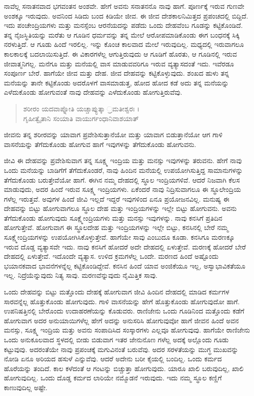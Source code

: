 ನಾವೆಲ್ಲ ಸನಾತನವಾದ ಭಗವಂತನ ಅಂಶವೇ. ಹೇಗೆ ಅವನು ಸನಾತನನೊ ನಾವು ಹಾಗೆ. ಪೂರ್ಣಕ್ಕೆ ಇರುವ ಗುಣವೇ ಅಂಶಕ್ಕೂ ಇರುವುದು. ಅವನಿಂದ ಸಿಡಿದು ಬಂದ ಕಿಡಿಯೇ ಜೀವ. ಈ ಜೀವ ದೇಶಕಾಲನಿಮಿತ್ತದ ಪ್ರಪಂಚದಲ್ಲಿ ಬಿದ್ದಿದೆ. ಇದು ಪಂಚೇಂದ್ರಿಯಗಳು ಮತ್ತು ಮನಸ್ಸೆಂಬ ಆರನೆಯದನ್ನು ಪಡೆದು ಒಂದು ದೇಹವೆಂಬ ಗೂಡನ್ನು ಕಟ್ಟಿಕೊಂಡಿದೆ. ತನ್ನ ನೈಜಸ್ಥಿತಿಯನ್ನು ಮರೆತು ಆ ಗೂಡಿನ ಧರ್ಮವನ್ನು ತನ್ನ ಮೇಲೆ ಆರೋಪಮಾಡಿಕೊಂಡು ಈಗ ಬಂಧನಕ್ಕೆ ಸಿಕ್ಕಿ ನರಳುತ್ತಿದೆ. ಆ ಗೂಡು ಹಿಂದೆ ಇರಲಿಲ್ಲ. ಇನ್ನು ಕೊಂಚ ಕಾಲವಾದ ಮೇಲೆ ಇರುವುದಿಲ್ಲ. ಮಧ್ಯದಲ್ಲಿ ಇರುವಾಗಲೂ ಕಾಲಕಾಲಕ್ಕೆ ಬದಲಾಯಿಸುತ್ತಿದೆ. ಈ ವಿಕಾರಗಳೆಲ್ಲ ಆಗುತ್ತಿರುವುದು ಆ ಗೂಡಿಗೆ ಹೊರತು, ಆ ಗೂಡಿನಲ್ಲಿ ಇರುವ ಜೀವಾತ್ಮನಿಗಲ್ಲ. ಮನೆಗೂ ಮತ್ತು ಮನೆಯಲ್ಲಿ ವಾಸ ಮಾಡುವವರಿಗೂ ಇರುವ ವ್ಯತ್ಯಾಸದಂತೆ ಇದು. ಇವೆರಡೂ ಸಂಪೂರ್ಣ ಬೇರೆ. ಹಾಗೆಯೇ ಜೀವ ಮತ್ತು ದೇಹ. ಜೀವ ದೇಹವನ್ನು ಕಟ್ಟಿಕೊಳ್ಳುವುದು. ಶಂಖದ ಹುಳು ತನ್ನ ಮನೆಯನ್ನು ತಾನೇ ಕಟ್ಟಿಕೊಂಡು ಅದರೊಳಗೆ ವಾಸಮಾಡುತ್ತ, ಹೋದ ಹೋದ ಕಡೆ ಅದು ತನ್ನ ಮನೆಯನ್ನು ಎಳೆದುಕೊಂಡು ಹೋಗುವಂತೆ ನಾವು ದೇಹವನ್ನು ಎಳೆದುಕೊಂಡು ಹೋಗುತ್ತಿರುವೆವು.

\begin{verse}
ಶರೀರಂ ಯದವಾಪ್ನೋತಿ ಯಚ್ಚಾಪ್ಯುತ್ಕಾ ್ರಮತೀಶ್ವರಃ ।\\ಗೃಹೀತ್ವೈತಾನಿ ಸಂಯಾತಿ ವಾಯುರ್ಗಂಧಾನಿವಾಶಯಾತ್ 
\end{verse}

{\small ಜೀವನು ತನ್ನ ಶರೀರವನ್ನು ಯಾವಾಗ ಪ್ರವೇಶಿಸುತ್ತಾನೆಯೋ ಮತ್ತು ಯಾವಾಗ ಬಿಡುತ್ತಾನೆಯೋ ಆಗ ಗಾಳಿ ವಾಸನೆಯನ್ನು ತೆಗೆದುಕೊಂಡು ಹೋಗುವ ಹಾಗೆ ಇವುಗಳನ್ನು ತೆಗೆದುಕೊಂಡು ಹೋಗುವನು.}

ಜೀವಿ ಈ ದೇಹವನ್ನು ಪ್ರವೇಶಿಸುವಾಗ ತನ್ನ ಸೂಕ್ಷ್ಮ ಇಂದ್ರಿಯ ಮತ್ತು ಮನಸ್ಸು ಇವುಗಳನ್ನು ತರುವನು. ಹೇಗೆ ನಾವು ಒಂದು ಮನೆಯನ್ನು ಬಾಡಿಗೆಗೆ ತೆಗೆದುಕೊಂಡರೆ, ನಾವು ಹಿಂದಿನ ಮನೆಯಲ್ಲಿ ಉಪಯೋಗಿಸುತ್ತಿದ್ದ ಸಾಮಾನುಗಳನ್ನು ತೆಗೆದುಕೊಂಡು ಬರುತ್ತೇವೆಯೋ ಹಾಗೆ. ಈಗಿನ ನಮ್ಮ ದೇಹದಲ್ಲಿ ಸ್ಥೂಲ ಇಂದ್ರಿಯಗಳಿವೆ. ಆದರೆ ನಿಜವಾಗಿ ಕೆಲಸ ಮಾಡುವುದು, ಅದರ ಹಿಂದೆ ಇರುವ ಸೂಕ್ಷ್ಮ ಇಂದ್ರಿಯಗಳು. ಏಕೆಂದರೆ ನಾವು ನಿದ್ರಿಸುವಾಗಲೂ ಈ ಸ್ಥೂಲೇಂದ್ರಿಯ ಗಳೆಲ್ಲ ಇರುತ್ತವೆ. ಅವುಗಳ ಹಿಂದೆ ಜೀವಿ ಇಲ್ಲದೆ ಇದ್ದರೆ ಇವುಗಳಿಂದ ಏನೂ ಪ್ರಯೋಜನವಿಲ್ಲ. ಮನುಷ್ಯ ಈ ದೇಹವನ್ನು ಬಿಟ್ಟು ಹೋಗುವಾಗಲೂ ಸ್ಥೂಲ ದೇಹ ಮತ್ತು ಇಂದ್ರಿಯಗಳನ್ನು ಇಲ್ಲೇ ಬಿಟ್ಟು ಹೋಗುವನು. ಅವನು ತೆಗೆದುಕೊಂಡು ಹೋಗುವುದು ಸೂಕ್ಷ್ಮೇಂದ್ರಿಯಗಳು ಮತ್ತು ಮನಸ್ಸು ಇವುಗಳನ್ನು. ನಾವು ಕನಸಿಗೆ ಪ್ರತಿದಿನ ಹೋಗುತ್ತೇವೆ. ಹೋಗುವಾಗ ಈ ಸ್ಥೂಲದೇಹ ಮತ್ತು ಇಂದ್ರಿಯಗಳನ್ನು ಇಲ್ಲೇ ಬಿಟ್ಟು, ಕನಸಿನಲ್ಲಿ ಬೇರೆ ನಮ್ಮ ಸೂಕ್ಷ್ಮೇಂದ್ರಿಯಗಳನ್ನು ಉಪಯೋಗಿಸಿಕೊಳ್ಳುತ್ತೇವೆ. ಹಾಗೆಯೇ ಸಾವು ಎಂಬುದೂ ಕೂಡಾ. ಕನಸಿಗೂ ಮರಣಕ್ಕೂ ಇರುವ ದೊಡ್ಡ ವ್ಯತ್ಯಾಸವೇ ಇದು. ನಾವು ಕನಸಿಗೆ ಹೋದರೆ ಅದೇ ದೇಹದಲ್ಲಿ ಏಳುತ್ತೇವೆ. ಮರಣಕ್ಕೆ ಹೋದರೆ ಬೇರೆ ದೇಹದಲ್ಲಿ ಏಳುತ್ತೇವೆ. ಇದೊಂದೇ ವ್ಯತ್ಯಾಸ. ಉಳಿದ ಕ್ರಮಗಳೆಲ್ಲ ಒಂದೇ. ಮರಣದ ಹಿಂದೆ ಅಷ್ಟೊಂದು ಭಯಾನಕವಾದ ಭಾವನೆಗಳನ್ನೆಲ್ಲ ಕಟ್ಟಿಕೊಂಡಿದ್ದೇವೆ. ಕನಸಿನ ಹಿಂದೆ ಯಾವ ಅಂಜಿಕೆಯೂ ಇಲ್ಲ, ಅಸ್ವಾಭಾವಿಕತೆಯೂ ಇಲ್ಲ. ನಿದ್ರೆಯೆನ್ನುವುದು ನಿತ್ಯ ಸಾವು. ಮರಣವೆನ್ನುವುದು ನೈಮಿತ್ತಿಕ ಸಾವು.

ಒಂದು ದೇಹವನ್ನು ಬಿಟ್ಟು ಮತ್ತೊಂದು ದೇಹಕ್ಕೆ ಹೋಗುವಾಗ ಜೀವಿ ಹಿಂದಿನ ದೇಹದಲ್ಲಿ ಮಾಡಿದ ಕರ್ಮಗಳ ಸಾರವನ್ನೆಲ್ಲ ಹೊತ್ತುಕೊಂಡು ಹೋಗುವುದು. ಗಾಳಿ ವಾಸನೆಯನ್ನು ಹೇಗೆ ಹೊತ್ತುಕೊಂಡು ಹೋಗುವುದೋ ಹಾಗೆ. ಉಪನಿಷತ್ತಿನಲ್ಲಿ ಬೇರೊಂದು ಉದಾಹರಣೆಯನ್ನು ಕೊಡುವರು. ರಾಣಿಜೇನು ಒಂದು ಗೂಡಿನಿಂದ ಮತ್ತೊಂದು ಕಡೆಗೆ ಹೋಗುವಾಗ ಅದರ ಅನುಯಾಯಿಗಳೆಲ್ಲ ಹೇಗೆ ಅದನ್ನು ಅನುಸರಿಸಿ ಹೋಗುವುವೋ ಹಾಗೆ ಜೀವನ ಹಿಂದೆ ಅವನ ಮನಸ್ಸು, ಸೂಕ್ಷ್ಮ ಇಂದ್ರಿಯ ಮತ್ತು ಅವನು ಸಂಪಾದಿಸಿದ ಸಂಸ್ಕಾರಗಳು ಎಲ್ಲವೂ ಹೋಗುವುವು. ಹಾಗೆಯೇ ರಾಣಿಜೇನು ಒಂದು ಅನುಕೂಲವಾದ ಸ್ಥಳದಲ್ಲಿ ಬೀಡು ಬಿಡುವಾಗ ಇತರ ಜೇನುನೊಣ ಗಳೆಲ್ಲ ಅದಕ್ಕೆ ಅಲ್ಲೊಂದು ಗೂಡು ಕಟ್ಟುವುವು. ಅದರಂತೆಯೇ ನಾವು ಪ್ರಪಂಚಕ್ಕೆ ಮಗುವಿನಂತೆ ಬರುವೆವು. ಅದರ ಸರಳತೆಯನ್ನು ಮುಗ್ಧ ಮುಖವನ್ನು ನೋಡಿ ಏನೂ ಅರಿಯದ ಹಸುಳೆ ಎನ್ನುವೆವು. ಆದರೆ ಅದೇನು ಬರೀ ಕೈಯಲ್ಲಿ ಬಂದಿಲ್ಲ. ಒಂದು ಕರ್ಮದ ಹೊರೆಯನ್ನು ತಂದಿದೆ. ಕಾಲ ಕಳೆದಂತೆ ಆ ಗಂಟನ್ನು ಬಿಚ್ಚುತ್ತಾ ಹೋಗುವುದು. ಯಾರೂ ಖಾಲಿ ಬರುವುದಿಲ್ಲ, ಖಾಲಿ ಹೋಗುವುದಿಲ್ಲ. ಒಂದು ದೊಡ್ಡ ಕರ್ಮದ ಲಾರಿಯೇ ನಮ್ಮೊಡನೆ ಇರುವುದು. ಇದು ನಮ್ಮ ಸ್ಥೂಲ ಕಣ್ಣಿಗೆ ಕಾಣುವುದಿಲ್ಲ ಅಷ್ಟೇ.


